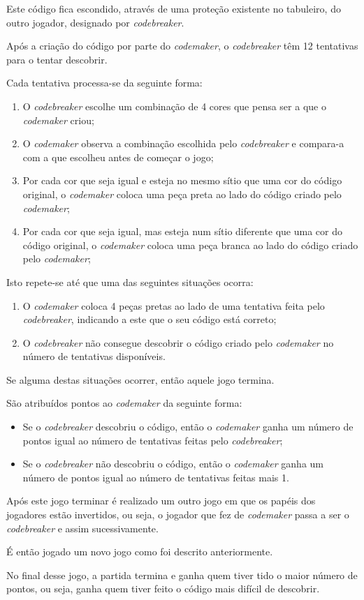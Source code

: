 Este código fica escondido, através de uma proteção existente no
tabuleiro, do outro jogador, designado por \emph{codebreaker}.

Após a criação do código por parte do \emph{codemaker}, o \emph{codebreaker} têm 12
tentativas para o tentar descobrir.

Cada tentativa processa-se da seguinte forma:
%
\begin{enumerate}
\item O \emph{codebreaker} escolhe um combinação de 4 cores que pensa ser a
  que o \emph{codemaker} criou;
\item O \emph{codemaker} observa a combinação escolhida pelo \emph{codebreaker} e
  compara-a com a que escolheu antes de começar o jogo;
\item Por cada cor que seja igual e esteja no mesmo sítio que uma cor
  do código original, o \emph{codemaker} coloca uma peça preta ao lado do
  código criado pelo \emph{codemaker};
\item Por cada cor que seja igual, mas esteja num sítio diferente que
  uma cor do código original, o \emph{codemaker} coloca uma peça branca ao
  lado do código criado pelo \emph{codemaker};
\end{enumerate}

Isto repete-se até que uma das seguintes situações ocorra:
%
\begin{enumerate}
\item O \emph{codemaker} coloca 4 peças pretas ao lado de uma tentativa feita
  pelo \emph{codebreaker}, indicando a este que o seu código está correto;
\item O \emph{codebreaker} não consegue descobrir o código criado pelo
  \emph{codemaker} no número de tentativas disponíveis.
\end{enumerate}

Se alguma destas situações ocorrer, então aquele jogo termina.

São atribuídos pontos ao \emph{codemaker} da seguinte forma:
%
\begin{itemize}
\item Se o \emph{codebreaker} descobriu o código, então o \emph{codemaker} ganha um
  número de pontos igual ao número de tentativas feitas pelo \emph{codebreaker};
\item Se o \emph{codebreaker} não descobriu o código, então o \emph{codemaker} ganha
  um número de pontos igual ao número de tentativas feitas mais 1.
\end{itemize}

Após este jogo terminar é realizado um outro jogo em que os papéis dos
jogadores estão invertidos, ou seja, o jogador que fez de \emph{codemaker}
passa a ser o \emph{codebreaker} e assim sucessivamente.

É então jogado um novo jogo como foi descrito anteriormente.

No final desse jogo, a partida termina e ganha quem tiver tido o maior
número de pontos, ou seja, ganha quem tiver feito o código mais
difícil de descobrir.


